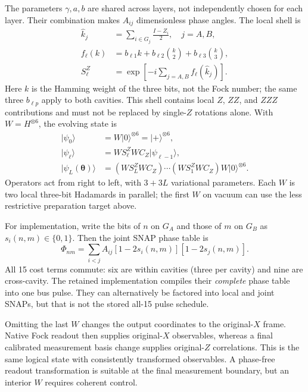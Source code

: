 \documentclass[aps,prb,reprint,amsmath,amssymb,nofootinbib]{revtex4-2}
\newcommand{\ket}[1]{\lvert#1\rangle}
\begin{document}
The parameters $\gamma,a,b$ are shared across layers, not independently
chosen for each layer. Their combination makes $A_{ij}$ dimensionless
phase angles. The local shell is
\begin{align}
 \hat k_j&=\sum_{i\in G_j}\frac{I-Z_i}{2},\quad j=A,B,\\
 f_\ell(k)&=b_{\ell1}k+b_{\ell2}{k\choose2}
                         +b_{\ell3}{k\choose3},\\
 S_\ell^Z&=\exp\!\left[-i\sum_{j=A,B}f_\ell(\hat k_j)\right].
\end{align}
Here $k$ is the Hamming weight of the three bits, not the Fock number;
the same three $b_{\ell p}$ apply to both cavities. This shell contains
local $Z$, $ZZ$, and $ZZZ$ contributions and must not be replaced by
single-$Z$ rotations alone. With $W=H^{\otimes6}$, the evolving state is
\begin{align}
 \ket{\psi_0}&=W\ket0^{\otimes6}=\ket+^{\otimes6},\\
 \ket{\psi_\ell}&=W S_\ell^Z W C_Z\ket{\psi_{\ell-1}},\\
 \ket{\psi_L(\bm\theta)}&=
  (W S_L^Z W C_Z)\cdots(W S_1^Z W C_Z)W\ket0^{\otimes6}.
 \label{eq:ansatzstate}
\end{align}
Operators act from right to left, with $3+3L$ variational parameters.
Each $W$ is two local three-bit Hadamards in parallel; the first $W$ on
vacuum can use the less restrictive preparation target above.

For implementation, write the bits of $n$ on $G_A$ and those of $m$ on
$G_B$ as $s_i(n,m)\in\{0,1\}$. Then the joint SNAP phase table is
\begin{equation}
 \Phi_{nm}=\sum_{i<j}A_{ij}
           [1-2s_i(n,m)][1-2s_j(n,m)].
\end{equation}
All 15 cost terms commute: six are within cavities (three per cavity)
and nine are cross-cavity. The retained implementation compiles their
\emph{complete} phase table into one bus pulse. They can alternatively
be factored into local and joint SNAPs, but that is not the stored
all-15 pulse schedule.

Omitting the last $W$ changes the output coordinates to the original-$X$
frame. Native Fock readout then supplies original-$X$ observables, whereas
a final calibrated measurement basis change supplies original-$Z$
correlations. This is the same logical state with consistently transformed
observables. A phase-free readout transformation is suitable at the final
measurement boundary, but an interior $W$ requires coherent control.
\end{document}
